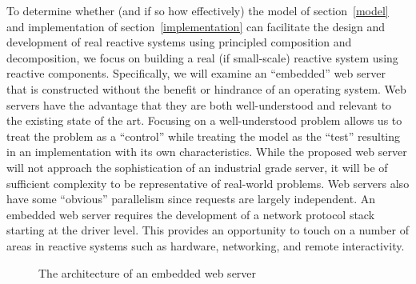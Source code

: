 To determine whether (and if so how effectively) the model of section~\ref{model} and implementation of section~\ref{implementation} can facilitate the design and development of real reactive systems using principled composition and decomposition, we focus on building a real (if small-scale) reactive system using reactive components.
Specifically, we will examine an ``embedded'' web server that is constructed without the benefit or hindrance of an operating system.
Web servers have the advantage that they are both well-understood and relevant to the existing state of the art.
Focusing on a well-understood problem allows us to treat the problem as a ``control'' while treating the model as the ``test'' resulting in an implementation with its own characteristics.
While the proposed web server will not approach the sophistication of an industrial grade server, it will be of sufficient complexity to be representative of real-world problems.
Web servers also have some ``obvious'' parallelism since requests are largely independent.
An embedded web server requires the development of a network protocol stack starting at the driver level.
This provides an opportunity to touch on a number of areas in reactive systems such as hardware, networking, and remote interactivity.

\begin{figure}
{

\centerline{\box\graph}
}
\caption{The architecture of an embedded web server\label{webserver}}
\end{figure}


